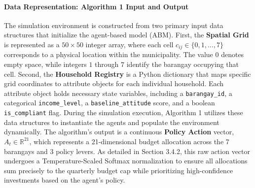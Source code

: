 \paragraph{Data Representation: Algorithm 1 Input and Output}
The simulation environment is constructed from two primary input data structures that initialize the agent-based model (ABM). First, the \textbf{Spatial Grid} is represented as a \(50 \times 50\) integer array, where each cell \(c_{ij} \in \{0, 1, ..., 7\}\) corresponds to a physical location within the municipality. The value \(0\) denotes empty space, while integers \(1\) through \(7\) identify the barangay occupying that cell. Second, the \textbf{Household Registry} is a Python dictionary that maps specific grid coordinates to attribute objects for each individual household. Each attribute object holds necessary state variables, including a \texttt{barangay\_id}, a categorical \texttt{income\_level}, a \texttt{baseline\_attitude} score, and a boolean \texttt{is\_compliant} flag. During the simulation execution, Algorithm 1 utilizes these data structures to instantiate the agents and populate the environment dynamically. The algorithm's output is a continuous \textbf{Policy Action} vector, \(A_t \in \mathbb{R}^{21}\), which represents a 21-dimensional budget allocation across the 7 barangays and 3 policy levers. As detailed in Section 3.4.2, this raw action vector undergoes a Temperature-Scaled Softmax normalization to ensure all allocations sum precisely to the quarterly budget cap while prioritizing high-confidence investments based on the agent's policy.

